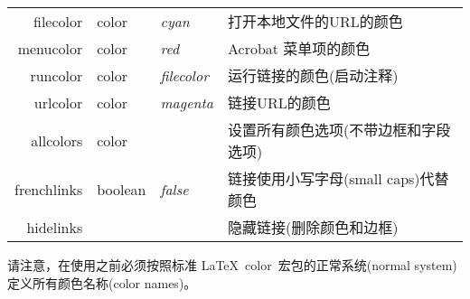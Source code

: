 \documentclass{article}
\newcommand*{\xpackage}[1]{\textsf{#1}}
\begin{document}
\begin{longtable}{@{}>{\ttfamily}rl>{\itshape}lp{8cm}@{}}
filecolor      & color   & cyan    & 打开本地文件的URL的颜色\\
menucolor      & color   & red     & Acrobat 菜单项的颜色\\
runcolor       & color   & filecolor & 运行链接的颜色(启动注释)\\
urlcolor       & color   & magenta & 链接URL的颜色 \\
allcolors      & color   &         & 设置所有颜色选项(不带边框和字段选项)\\
frenchlinks    & boolean & false   & 链接使用小写字母(small caps)代替颜色\\
hidelinks      &         &         & 隐藏链接(删除颜色和边框)\\
\end{longtable} \smallskip

请注意，在使用之前必须按照标准 \LaTeX\ \xpackage{color}\ 宏包的正常系统(normal system)定义所有颜色名称(color names)。
\end{document}
